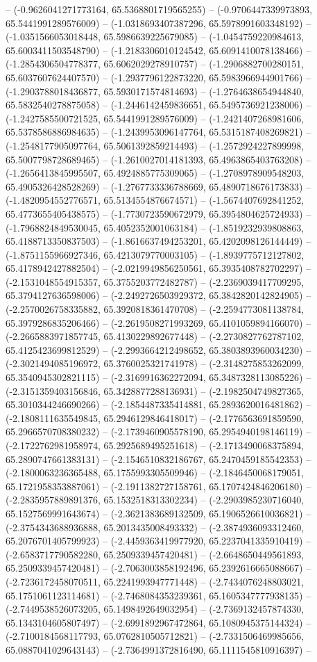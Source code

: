-- (-0.9626041271773164, 65.5368801719565255) -- (-0.9706447339973893, 65.5441991289576009) -- (-1.0318693407387296, 65.5978991603348192) -- (-1.0351566053018448, 65.5986639225679085) -- (-1.0454759220984613, 65.6003411503548790) -- (-1.2183306010124542, 65.6091410078138466) -- (-1.2854306504778377, 65.6062029278910757) -- (-1.2906882700280151, 65.6037607624407570) -- (-1.2937796122873220, 65.5983966944901766) -- (-1.2903788018436877, 65.5930171574814693) -- (-1.2764638654944840, 65.5832540278875058) -- (-1.2446142459836651, 65.5495736921238006) -- (-1.2427585500721525, 65.5441991289576009) -- (-1.2421407268981606, 65.5378586886984635) -- (-1.2439953096147764, 65.5315187408269821) -- (-1.2548177905097764, 65.5061392859214493) -- (-1.2572924227899998, 65.5007798728689465) -- (-1.2610027014181393, 65.4963865403763208) -- (-1.2656413845995507, 65.4924885775309065) -- (-1.2708978909548203, 65.4905326428528269) -- (-1.2767733336788669, 65.4890718676173833) -- (-1.4820954552776571, 65.5134554876674571) -- (-1.5674407692841252, 65.4773655405438575) -- (-1.7730723590672979, 65.3954804625724933) -- (-1.7968824849530045, 65.4052352001063184) -- (-1.8519232939808863, 65.4188713350837503) -- (-1.8616637494253201, 65.4202098126144449) -- (-1.8751155966927346, 65.4213079770003105) -- (-1.8939775712127802, 65.4178942427882504) -- (-2.0219949856250561, 65.3935408782702297) -- (-2.1531048554915357, 65.3755203772482787) -- (-2.2369039417709295, 65.3794127636598006) -- (-2.2492726503929372, 65.3842820142824905) -- (-2.2570026758335882, 65.3920818361470708) -- (-2.2594773081138784, 65.3979286835206466) -- (-2.2619508271993269, 65.4101059894166070) -- (-2.2665883971857745, 65.4130229892677448) -- (-2.2730827762787102, 65.4125423699812529) -- (-2.2993664212498652, 65.3803893960034230) -- (-2.3021494085196972, 65.3760025321741978) -- (-2.3148275853262099, 65.3540945302821115) -- (-2.3169916362272094, 65.3487328113085226) -- (-2.3151359403156846, 65.3428877288136931) -- (-2.1982504749827365, 65.3010344246690266) -- (-2.1854487335414881, 65.2893620016481862) -- (-2.1808111635549845, 65.2946129846418017) -- (-2.1776563691859590, 65.2966570708380232) -- (-2.1739460905578190, 65.2954940198146119) -- (-2.1722762981958974, 65.2925689495251618) -- (-2.1713490068375894, 65.2890747661383131) -- (-2.1546510832186767, 65.2470459185542353) -- (-2.1800063236365488, 65.1755993305509946) -- (-2.1846450068179051, 65.1721958353887061) -- (-2.1911382727158761, 65.1707424846206180) -- (-2.2835957889891376, 65.1532518313302234) -- (-2.2903985230716040, 65.1527569991643674) -- (-2.3621383689132509, 65.1906526610036821) -- (-2.3754343688936888, 65.2013435008493332) -- (-2.3874936093312460, 65.2076701405799923) -- (-2.4459363419977920, 65.2237041335910419) -- (-2.6583717790582280, 65.2509339457420481) -- (-2.6648650449561893, 65.2509339457420481) -- (-2.7063003858192496, 65.2392616665088667) -- (-2.7236172458070511, 65.2241993947771448) -- (-2.7434076248803021, 65.1751061123114681) -- (-2.7468084353239361, 65.1605347777938135) -- (-2.7449538526073205, 65.1498492649032954) -- (-2.7369132457874330, 65.1343104605807497) -- (-2.6991892967472864, 65.1080945375144324) -- (-2.7100184568117793, 65.0762810505712821) -- (-2.7331506469985656, 65.0887041029643143) -- (-2.7364991372816490, 65.1111545810916397) -- 